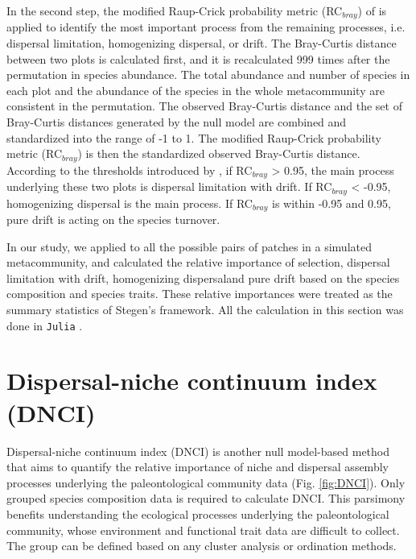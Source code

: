 In the second step, the modified Raup-Crick probability metric (RC$_{bray}$) of \citet{chase2011disentangling} is applied to identify the most important process from the remaining processes, i.e. dispersal limitation, homogenizing dispersal, or drift. The Bray-Curtis distance between two plots is calculated first, and it is recalculated 999 times after the permutation in species abundance. The total abundance and number of species in each plot and the abundance of the species in the whole metacommunity are consistent in the permutation. The observed Bray-Curtis distance and the set of Bray-Curtis distances generated by the null model are combined and standardized into the range of -1 to 1. The modified Raup-Crick probability metric (RC$_{bray}$) is then the standardized observed Bray-Curtis distance. According to the thresholds introduced by \citet{chase2011disentangling}, if RC$_{bray}$ > 0.95, the main process underlying these two plots is dispersal limitation with drift. If RC$_{bray}$ < -0.95, homogenizing dispersal is the main process. If RC$_{bray}$ is within -0.95 and 0.95, pure drift is acting on the species turnover.

In our study, we applied \DIFdelbegin {}\DIFdelend \DIFaddbegin {}\DIFaddend to all the possible pairs of patches in a simulated metacommunity, and calculated the relative importance \DIFaddbegin {}\DIFaddend of selection, dispersal limitation with drift, homogenizing dispersal\DIFaddbegin \DIFadd{, }\DIFaddend and pure drift based on the species composition and species traits. These relative importances were treated as the summary statistics of Stegen's framework. All the calculation in this section was done in \texttt{Julia} \citep{bezanson2017julia}.

\section{Dispersal-niche continuum index (DNCI)}
\noindent
\label{sec:dnci}
Dispersal-niche continuum index (DNCI) is another null model-based method that aims to quantify the relative importance of niche and dispersal assembly processes underlying the paleontological community data \citep{vilmi2021dispersal} (Fig. \ref{fig:DNCI}). Only grouped species composition data is required to calculate DNCI. This parsimony benefits understanding the ecological processes underlying the paleontological community, whose environment and functional trait data are difficult to collect. The group can be defined based on any cluster analysis or ordination methods.



